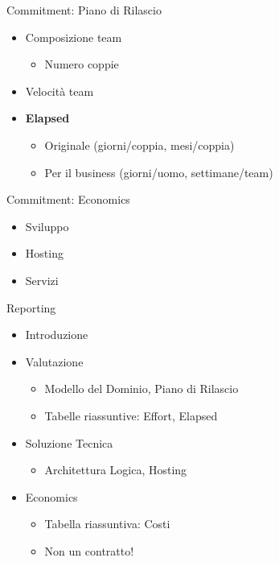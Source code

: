 \documentclass[compress, red, 14pt]{beamer}
\begin{document}
	\begin{frame}{Commitment: Piano di Rilascio}
		
		\begin{itemize}
			\item Composizione team
			\begin{itemize}
				\item Numero coppie
			\end{itemize}
			\item Velocità team
		\end{itemize}

		\begin{itemize}
			\item \textbf{Elapsed}
			\begin{itemize}
				\item Originale (giorni/coppia, mesi/coppia)
				\item Per il business (giorni/uomo, settimane/team)
			\end{itemize}
		\end{itemize}

	\end{frame}
	
	\begin{frame}{Commitment: Economics}
		\begin{itemize}
			\item Sviluppo
			\item Hosting
			\item Servizi
		\end{itemize}

	\end{frame}
	
	\begin{frame}{Reporting}
		\begin{itemize}
			\item Introduzione
			\item Valutazione
			\begin{itemize}
				\item Modello del Dominio, Piano di Rilascio
				\item Tabelle riassuntive: Effort, Elapsed
			\end{itemize}
			\item Soluzione Tecnica
			\begin{itemize}
				\item Architettura Logica, Hosting
			\end{itemize}
			\item Economics
			\begin{itemize}
				\item Tabella riassuntiva: Costi
				\item Non un contratto!
			\end{itemize}
		\end{itemize}
	\end{frame}
	
\end{document}
